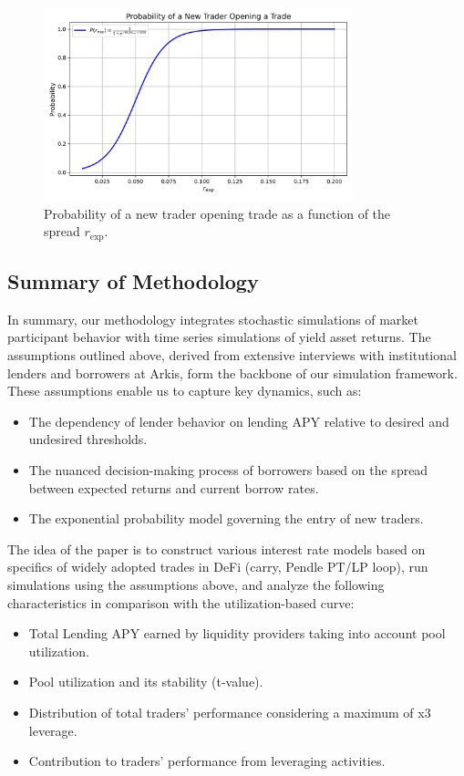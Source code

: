 \documentclass[12pt]{article}
\begin{document}
\begin{figure}[h!]
\centering
\includegraphics[width=0.8\textwidth]{images/prob_borrow_more.png}
\caption{Probability of a new trader opening trade as a function of the spread \(r_{\text{exp}}\).}
\label{fig:prob_borrow_more}
\end{figure}



\subsection{Summary of Methodology}

In summary, our methodology integrates stochastic simulations of market participant behavior with time series simulations of yield asset returns. The assumptions outlined above, derived from extensive interviews with institutional lenders and borrowers at Arkis, form the backbone of our simulation framework. These assumptions enable us to capture key dynamics, such as:
\begin{itemize}
    \item The dependency of lender behavior on lending APY relative to desired and undesired thresholds.
    \item The nuanced decision-making process of borrowers based on the spread between expected returns and current borrow rates.
    \item The exponential probability model governing the entry of new traders.
\end{itemize}

The idea of the paper is to construct various interest rate models based on specifics of widely adopted trades in DeFi (carry, Pendle PT/LP loop), run simulations using the assumptions above, and analyze the following characteristics in comparison with the utilization-based curve: 
\begin{itemize}
	\item Total Lending APY earned by liquidity providers taking into account pool utilization. 
	\item Pool utilization and its stability (t-value). 
	\item Distribution of total traders' performance considering a maximum of x3 leverage. 
	\item Contribution to traders' performance from leveraging activities. 
\end{itemize}






\end{document}
